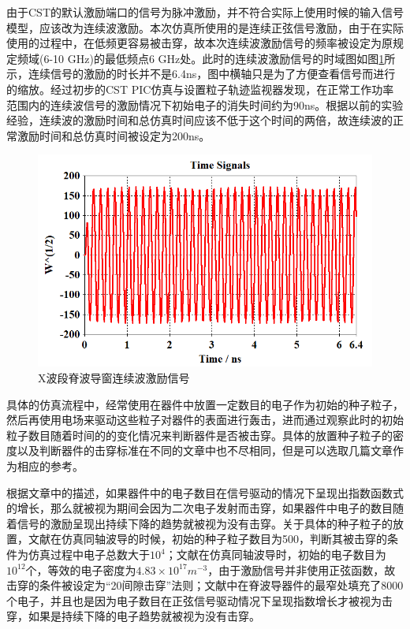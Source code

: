 \documentclass[master]{thesis-uestc}
\begin{document}
由于CST的默认激励端口的信号为脉冲激励，并不符合实际上使用时候的输入信号模型，应该改为连续波激励。本次仿真所使用的是连续正弦信号激励，由于在实际使用的过程中，在低频更容易被击穿，故本次连续波激励信号的频率被设定为原规定频域(6-10 GHz)的最低频点6 GHz处。此时的连续波激励信号的时域图如图\ref{fig:X波导窗连续波激励信号}所示，连续信号的激励的时长并不是6.4ns，图中横轴只是为了方便查看信号而进行的缩放。经过初步的CST PIC仿真与设置粒子轨迹监视器发现，在正常工作功率范围内的连续波信号的激励情况下初始电子的消失时间约为90ns。根据以前的实验经验，连续波的激励时间和总仿真时间应该不低于这个时间的两倍，故连续波的正常激励时间和总仿真时间被设定为200ns。
\begin{figure}[!htb]
    \centering
    \includegraphics[width=0.6\linewidth]{pic/chapter3/X波段脊波导窗连续波激励信号.png}
    \caption{X波段脊波导窗连续波激励信号}
    \label{fig:X波导窗连续波激励信号}
\end{figure}

具体的仿真流程中，经常使用在器件中放置一定数目的电子作为初始的种子粒子，然后再使用电场来驱动这些粒子对器件的表面进行轰击，进而通过观察此时的初始粒子数目随着时间的的变化情况来判断器件是否被击穿。具体的放置种子粒子的密度以及判断器件的击穿标准在不同的文章中也不尽相同，但是可以选取几篇文章作为相应的参考。

根据文章\cite{li_2021_novel_multipactor}中的描述，如果器件中的电子数目在信号驱动的情况下呈现出指数函数式的增长，那么就被视为期间会因为二次电子发射而击穿，如果器件中电子的数目随着信号的激励呈现出持续下降的趋势就被视为没有击穿。关于具体的种子粒子的放置，文献\cite{gonzalez_2015_experimental}在仿真同轴波导的时候，初始的种子粒子数目为500，判断其被击穿的条件为仿真过程中电子总数大于$10^4$；文献\cite{gonzalez_2016_multipactor}在仿真同轴波导时，初始的电子数目为$10^{12}$个，等效的电子密度为$4.83 \times 10^{17} m^{-3}$，由于激励信号并非使用正弦函数，故击穿的条件被设定为“20间隙击穿”法则；文献\cite{you_2015_highly}中在脊波导器件的最窄处填充了8000个电子，并且也是因为电子数目在正弦信号驱动情况下呈现指数增长才被视为击穿，如果是持续下降的电子趋势就被视为没有击穿。
\end{document}
